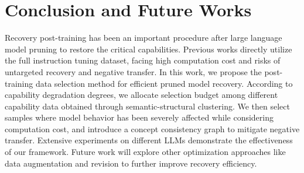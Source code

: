\section{Conclusion and Future Works}
\vspace{-1mm}
Recovery post-training has been an important procedure after large language model pruning to restore the critical capabilities. Previous works directly utilize the full instruction tuning dataset, facing high computation cost and risks of untargeted recovery and negative transfer. In this work, we propose the post-training data selection method for efficient pruned model recovery. According to capability degradation degrees, we allocate selection budget among different capability data obtained through semantic-structural clustering. We then select samples where model behavior has been severely affected while considering computation cost, and introduce a concept consistency graph to mitigate negative transfer. Extensive experiments on different LLMs demonstrate the effectiveness of our framework. Future work will explore other optimization approaches like data augmentation and revision to further improve recovery efficiency.
